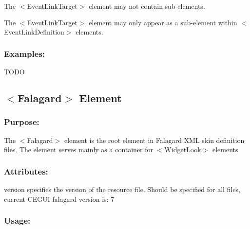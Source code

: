 \begin{DoxyItemize}
\item The {\ttfamily $<$Event\+Link\+Target$>$} element may not contain sub-\/elements. 
\item The {\ttfamily $<$Event\+Link\+Target$>$} element may only appear as a sub-\/element within {\ttfamily $<$Event\+Link\+Definition$>$} elements. 
\end{DoxyItemize}\hypertarget{fal_element_ref_fal_elem_ref_eventlinktarget_4}{}\subsubsection{Examples\+:}\label{fal_element_ref_fal_elem_ref_eventlinktarget_4}
T\+O\+DO\hypertarget{fal_element_ref_fal_elem_ref_sec_11}{}\subsection{$<$\+Falagard$>$ Element}\label{fal_element_ref_fal_elem_ref_sec_11}
\hypertarget{fal_element_ref_fal_elem_ref_sec_11_1}{}\subsubsection{Purpose\+:}\label{fal_element_ref_fal_elem_ref_sec_11_1}
The {\ttfamily $<$Falagard$>$} element is the root element in Falagard X\+ML skin definition files. The element serves mainly as a container for {\ttfamily $<$Widget\+Look$>$} elements\hypertarget{fal_element_ref_fal_elem_ref_sec_11_2}{}\subsubsection{Attributes\+:}\label{fal_element_ref_fal_elem_ref_sec_11_2}
\begin{DoxyItemize}
\item {\ttfamily version} specifies the version of the resource file. Should be specified for all files, current C\+E\+G\+UI falagard version is\+: 7\end{DoxyItemize}
\hypertarget{fal_element_ref_fal_elem_ref_sec_11_3}{}\subsubsection{Usage\+:}\label{fal_element_ref_fal_elem_ref_sec_11_3}

